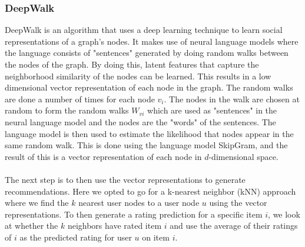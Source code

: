 \subsubsection{DeepWalk}
DeepWalk is an algorithm that uses a deep learning technique to learn social representations of a graph's nodes\cite{DeepWalk}.
It makes use of neural language models where the language consists of "sentences" generated by doing random walks between the nodes of the graph.
By doing this, latent features that capture the neighborhood similarity of the nodes can be learned.
This results in a low dimensional vector representation of each node in the graph.
The random walks are done a number of times for each node $v_i$.
The nodes in the walk are chosen at random to form the random walks $W_{vi}$ which are used as "sentences" in the neural language model and the nodes are the "words" of the sentences.
The language model is then used to estimate the likelihood that nodes appear in the same random walk.
This is done using the language model SkipGram, and the result of this is a vector representation of each node in $d$-dimensional space.
\\\\
The next step is to then use the vector representations to generate recommendations.
Here we opted to go for a k-nearest neighbor (kNN) approach where we find the $k$ nearest user nodes to a user node $u$ using the vector representations.
To then generate a rating prediction for a specific item $i$, we look at whether the $k$ neighbors have rated item $i$ and use the average of their ratings of $i$ as the predicted rating for user $u$ on item $i$.
